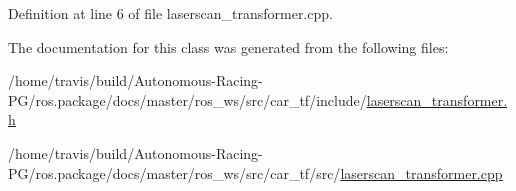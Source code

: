 Definition at line 6 of file laserscan\+\_\+transformer.\+cpp.



The documentation for this class was generated from the following files\+:\begin{DoxyCompactItemize}
\item 
/home/travis/build/\+Autonomous-\/\+Racing-\/\+P\+G/ros.\+package/docs/master/ros\+\_\+ws/src/car\+\_\+tf/include/\hyperlink{laserscan__transformer_8h}{laserscan\+\_\+transformer.\+h}\item 
/home/travis/build/\+Autonomous-\/\+Racing-\/\+P\+G/ros.\+package/docs/master/ros\+\_\+ws/src/car\+\_\+tf/src/\hyperlink{laserscan__transformer_8cpp}{laserscan\+\_\+transformer.\+cpp}\end{DoxyCompactItemize}
